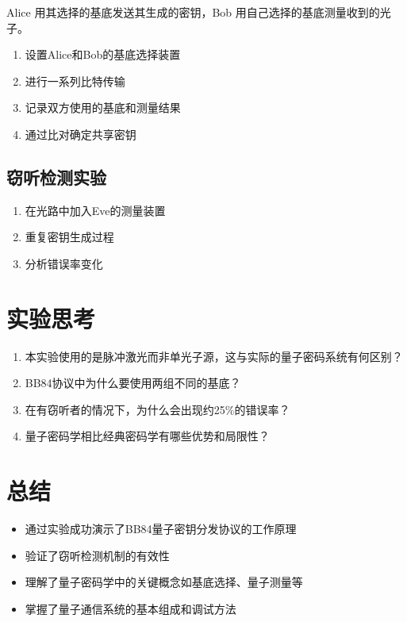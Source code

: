 \documentclass{ctexart}
\begin{document}
Alice 用其选择的基底发送其生成的密钥，Bob 用自己选择的基底测量收到的光子。
\begin{enumerate}
\item 设置Alice和Bob的基底选择装置
\item 进行一系列比特传输
\item 记录双方使用的基底和测量结果
\item 通过比对确定共享密钥
\end{enumerate}

\subsection{窃听检测实验}
\begin{enumerate}
\item 在光路中加入Eve的测量装置
\item 重复密钥生成过程
\item 分析错误率变化
\end{enumerate}

\section{实验思考}
\begin{enumerate}
\item 本实验使用的是脉冲激光而非单光子源，这与实际的量子密码系统有何区别？
\item BB84协议中为什么要使用两组不同的基底？
\item 在有窃听者的情况下，为什么会出现约25\%的错误率？
\item 量子密码学相比经典密码学有哪些优势和局限性？
\end{enumerate}

\section{总结}
\begin{itemize}
\item 通过实验成功演示了BB84量子密钥分发协议的工作原理
\item 验证了窃听检测机制的有效性
\item 理解了量子密码学中的关键概念如基底选择、量子测量等
\item 掌握了量子通信系统的基本组成和调试方法
\end{itemize}
\end{document}

